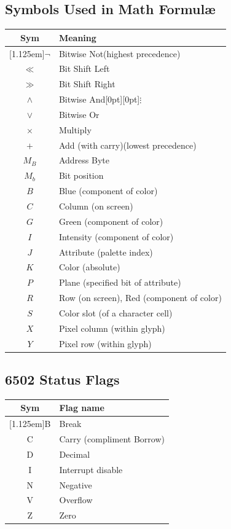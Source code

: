 \documentclass[12pt]{{memoir}}
\begin{document}
\subsection{Symbols Used in Math Formul\ae}

\begin{center}\begin{tabular}{cl}
Sym & Meaning \\
\hline
\raisebox{0pt}[1.125em]{$\lnot{}$} & Bitwise Not\hspace{\stretch{1}}(highest precedence) \\
$\ll$ & Bit Shift Left \\
$\gg$ & Bit Shift Right \\
$\wedge$ & Bitwise And\hspace{\stretch{2}}\raisebox{0pt}[0pt][0pt]{$\vdots$}\hspace*{\stretch{1}}\\
$\vee$ & Bitwise Or \\
$\times$ & Multiply \\
$+$ & Add (with carry)\hspace{\stretch{1}}(lowest precedence) \\
$M_B$ & Address Byte \\
$M_b$ & Bit position \\
$B$ & Blue (component of color) \\
$C$ & Column (on screen) \\
$G$ & Green (component of color) \\
$I$ & Intensity (component of color) \\
$J$ & Attribute (palette index) \\
$K$ & Color (absolute) \\
$P$ & Plane (specified bit of attribute) \\
$R$ & Row (on screen), Red (component of color) \\
$S$ & Color slot (of a character cell) \\
$X$ & Pixel column (within glyph) \\
$Y$ & Pixel row (within glyph) \\
\end{tabular}\end{center}

\subsection{6502 Status Flags}

\begin{center}\begin{tabular}{cl}
Sym & Flag name \\
\hline
\raisebox{0pt}[1.125em]{B} & Break \\
C & Carry (compliment Borrow) \\
D & Decimal \\
I & Interrupt disable \\
N & Negative \\
V & Overflow \\
Z & Zero \\
\end{tabular}\end{center}
\end{document}
